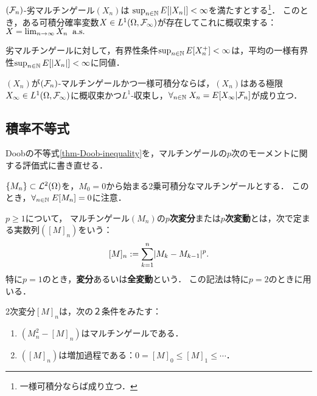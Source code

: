 \documentclass[uplatex,dvipdfmx]{jsreport}
\begin{document}
\begin{theorem}
    $(\mathcal{F}_n)$-劣マルチンゲール$(X_n)$は
    $\sup_{n\in\mathbb{N}}E[\lvert X_n\rvert]<\infty$を満たすとする\footnote{一様可積分ならば成り立つ．}．
    このとき，ある可積分確率変数$X\in L^1(\Omega,\mathcal{F}_\infty)$が存在してこれに概収束する：$X=\lim_{n\to\infty}X_n\;\;\mathrm{a.s.}$
\end{theorem}
\begin{remarks}
    劣マルチンゲールに対して，有界性条件$\sup_{n\in\mathbb{N}}E[X_n^+]<\infty$は，平均の一様有界性$\sup_{n\in\mathbb{N}}E[\lvert X_n\rvert]<\infty$に同値．
\end{remarks}

\begin{corollary}
    $(X_n)$が$(\mathcal{F}_n)$-マルチンゲールかつ一様可積分ならば，$(X_n)$はある極限$X_\infty\in L^1(\Omega,\mathcal{F}_\infty)$に概収束かつ$L^1$-収束し，$\forall_{n\in\mathbb{N}}\;X_n=E[X_\infty|\mathcal{F}_n]$が成り立つ．
\end{corollary}

\subsection{積率不等式}

\begin{tcolorbox}[colframe=ForestGreen, colback=ForestGreen!10!white,breakable,colbacktitle=ForestGreen!40!white,coltitle=black,fonttitle=\bfseries\sffamily,
title=]
    Doobの不等式\ref{thm-Doob-inequality}を，マルチンゲールの$p$次のモーメントに関する評価式に書き直せる．
\end{tcolorbox}

\begin{notation}
    $\{M_n\}\subset\mathcal{L}^2(\Omega)$を，$M_0=0$から始まる2乗可積分なマルチンゲールとする．
    このとき，$\forall_{n\in\mathbb{N}}\;E[M_n]=0$に注意．
\end{notation}

\begin{definition}
    $p\ge 1$について，
    マルチンゲール$(M_n)$の\textbf{$p$次変分}または\textbf{$p$次変動}とは，次で定まる実数列$([M]_n)$をいう：
    \[[M]_n:=\sum^n_{k=1}\lvert M_k-M_{k-1}\rvert^p.\]
    特に$p=1$のとき，\textbf{変分}あるいは\textbf{全変動}という．
    この記法は特に$p=2$のときに用いる．
\end{definition}

\begin{proposition}
    2次変分$[M]_n$は，次の２条件をみたす：
    \begin{enumerate}
        \item $(M_n^2-[M]_n)$はマルチンゲールである．
        \item $([M]_n)$は増加過程である：$0=[M]_0\le[M]_1\le\cdots$．
    \end{enumerate}
\end{proposition}
\end{document}

